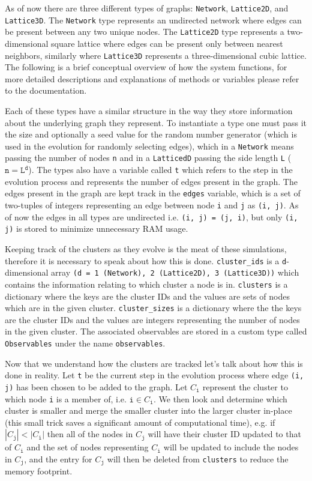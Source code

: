 As of now there are three different types of graphs: \texttt{Network}, \texttt{Lattice2D}, and \texttt{Lattice3D}.
The \texttt{Network} type represents an undirected network where edges can be present between any two unique nodes.
The \texttt{Lattice2D} type represents a two-dimensional square lattice where edges can be present only between nearest neighbors, similarly where \texttt{Lattice3D} represents a three-dimensional cubic lattice.
The following is a brief conceptual overview of how the system functions, for more detailed descriptions and explanations of methods or variables please refer to the documentation.

Each of these types have a similar structure in the way they store information about the underlying graph they represent.
To instantiate a type one must pass it the size and optionally a seed value for the random number generator (which is used in the evolution for randomly selecting edges), which in a \texttt{Network} means passing the number of nodes \texttt{n} and in a \texttt{LatticedD} passing the side length \texttt{L} ($\texttt{n} = \texttt{L}^\texttt{d}$).
The types also have a variable called \texttt{t} which refers to the step in the evolution process and represents the number of edges present in the graph.
The edges present in the graph are kept track in the \texttt{edges} variable, which is a set of two-tuples of integers representing an edge between node \texttt{i} and \texttt{j} as \texttt{(i, j)}.
As of now the edges in all types are undirected i.e. \texttt{(i, j) = (j, i)}, but only \texttt{(i, j)} is stored to minimize unnecessary RAM usage.

Keeping track of the clusters as they evolve is the meat of these simulations, therefore it is necessary to speak about how this is done.
\texttt{cluster\_ids} is a \texttt{d}-dimensional array \texttt{(d = 1 (Network), 2 (Lattice2D), 3 (Lattice3D))} which contains the information relating to which cluster a node is in.
\texttt{clusters} is a dictionary where the keys are the cluster IDs and the values are sets of nodes which are in the given cluster.
\texttt{cluster\_sizes} is a dictionary where the the keys are the cluster IDs and the values are integers representing the number of nodes in the given cluster.
The associated observables are stored in a custom type called \texttt{Observables} under the name \texttt{observables}.

Now that we understand how the clusters are tracked let's talk about how this is done in reality.
Let \texttt{t} be the current step in the evolution process where edge \texttt{(i, j)} has been chosen to be added to the graph.
Let $C_\texttt{i}$ represent the cluster to which node \texttt{i} is a member of, i.e. $\texttt{i} \in C_\texttt{i}$.
We then look and determine which cluster is smaller and merge the smaller cluster into the larger cluster in-place (this small trick saves a significant amount of computational time), e.g. if $|C_\texttt{j}| < |C_\texttt{i}|$ then all of the nodes in $C_\texttt{j}$ will have their cluster ID updated to that of $C_\texttt{i}$ and the set of nodes representing $C_\texttt{i}$ will be updated to include the nodes in $C_\texttt{j}$, and the entry for $C_\texttt{j}$ will then be deleted from \texttt{clusters} to reduce the memory footprint.

